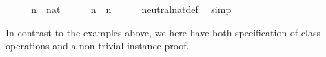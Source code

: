 \begin{isabellebody}
%
\isadelimproof
\ %
\endisadelimproof
%
\isatagproof
{}\isamarkupfalse%
\isanewline
\ \ \isamarkupfalse%
\ n\ {\isacharcolon}{\isacharcolon}\ nat\isanewline
\ \ \isamarkupfalse%
\ {\isachardoublequoteopen}{\isasymzero}\ {\isasymoplus}\ n\ {\isacharequal}\ n{\isachardoublequoteclose}\isanewline
\ \ \ \ \isamarkupfalse%
\ neutral{\isacharunderscore}nat{\isacharunderscore}def\ \isamarkupfalse%
\ simp\isanewline
{}\isamarkupfalse%
%
\endisatagproof
{\isafoldproof}%
%
\isadelimproof
%
\endisadelimproof
\isanewline
\isanewline
{}\isamarkupfalse%
%
\begin{isamarkuptext}%
\noindent In contrast to the examples above, we here have both
specification of class operations and a non-trivial instance proof.


\end{isamarkuptext}
\end{isabellebody}
